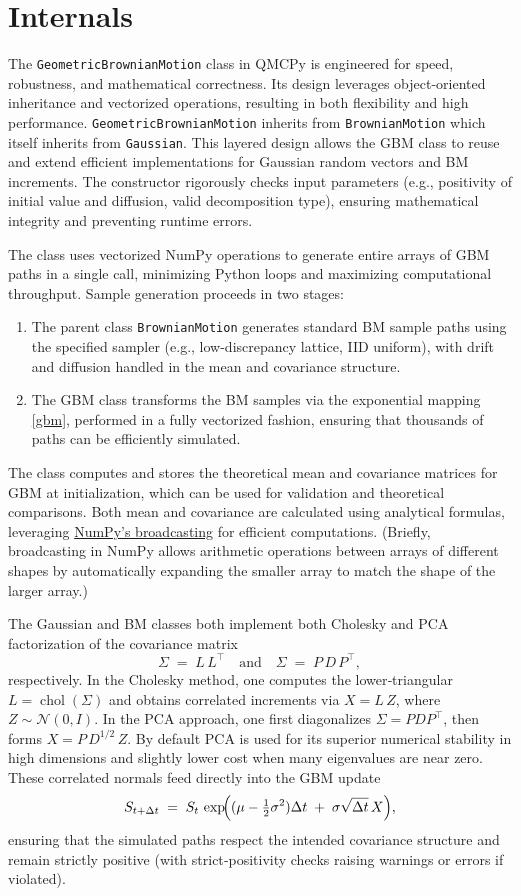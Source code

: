\documentclass{article}
\begin{document}
\section{Internals}

The \texttt{GeometricBrownianMotion} class in QMCPy is engineered for speed, robustness, and mathematical correctness. Its design leverages object-oriented inheritance and vectorized operations, resulting in both flexibility and high performance.
\texttt{GeometricBrownianMotion} inherits from \texttt{BrownianMotion} which itself inherits from \texttt{Gaussian}. This layered design allows the GBM class to reuse and extend efficient implementations for Gaussian random vectors and BM increments.
The constructor rigorously checks input parameters (e.g., positivity of initial value and diffusion, valid decomposition type), ensuring mathematical integrity and preventing runtime errors.

The class uses vectorized NumPy operations to generate entire arrays of GBM paths in a single call, minimizing Python loops and maximizing computational throughput. Sample generation proceeds in two stages:
\begin{enumerate}
\item 
The parent class \texttt{BrownianMotion} generates standard BM sample paths using the specified sampler (e.g., low-discrepancy lattice, IID uniform), with drift and diffusion handled in the mean and covariance structure.
\item  The GBM class transforms the BM samples via the exponential mapping    \eqref{gbm}, performed in a fully vectorized fashion, ensuring that thousands of paths can be efficiently simulated.
\end{enumerate}
The class computes and stores the theoretical mean and covariance matrices for GBM at initialization, which can be used for validation and theoretical comparisons. Both mean and covariance are calculated using analytical formulas, leveraging \href{https://numpy.org/devdocs/user/basics.broadcasting.html}{NumPy’s broadcasting} for efficient computations. (Briefly, broadcasting in NumPy allows arithmetic operations between arrays of different shapes by automatically expanding the smaller array to match the shape of the larger array.)

 The Gaussian and BM classes both implement both Cholesky and PCA factorization of the covariance matrix
\[
\Sigma \;=\; L\,L^{\!\top}
\quad\text{and}\quad
\Sigma \;=\; P\,D\,P^{\!\top},
\]
respectively.  In the Cholesky method, one computes the lower‐triangular $L=\operatorname{chol}(\Sigma)$ and obtains correlated increments via $X=L\,Z$, where $Z\sim\mathcal{N}(0,I)$.  In the PCA approach, one first diagonalizes $\Sigma=PDP^{\!\top}$, then forms $X = P\,D^{1/2}\,Z$.  By default PCA is used for its superior numerical stability in high dimensions and slightly lower cost when many eigenvalues are near zero.  These correlated normals feed directly into the GBM update
\[
S_{t+\Delta t} \;=\; S_t\,\exp\!\Bigl((\mu - \tfrac12\sigma^2)\Delta t \;+\;\sigma\sqrt{\Delta t}\,X\Bigr),
\]
ensuring that the simulated paths respect the intended covariance structure and remain strictly positive (with strict‐positivity checks raising warnings or errors if violated).
\end{document}

